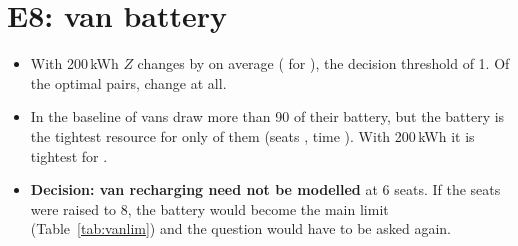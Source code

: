 \section{E8: van battery}\label{sec:e8}

\begin{itemize}
  \item With 200\,kWh $Z$ changes by \dZEeightBatHiMilp\pct{} on average (\dZEeightBatHiRt\pct{} for \Rt), \EeightDecision{} the decision threshold of 1\pct{}. Of the \DirNEeightBatHi{} optimal pairs, \EeightOptChanged{} change at all.
  \item In the baseline \VanBninetyBase\pct{} of vans draw more than 90\pct{} of their battery, but the battery is the tightest resource for only \VanBattTightBase\pct{} of them (seats \VanSeatTightBase\pct, time \VanTimeTightBase\pct). With 200\,kWh it is tightest for \VanBattTightEeight\pct.
  \item \textbf{Decision: van recharging need not be modelled} at 6 seats. If the seats were raised to 8, the battery would become the main limit (Table~\ref{tab:vanlim}) and the question would have to be asked again.
\end{itemize}

